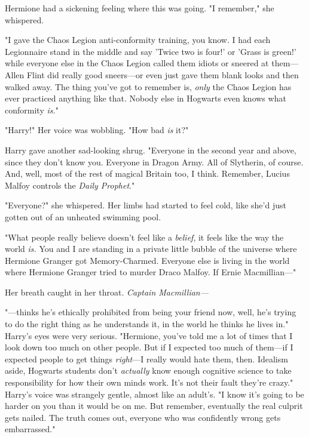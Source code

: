 Hermione had a sickening feeling where this was going. "I remember," she 
whispered.

"I gave the Chaos Legion anti-conformity training, you know. I had each 
Legionnaire stand in the middle and say 'Twice two is four!' or 'Grass is 
green!' while everyone else in the Chaos Legion called them idiots or sneered 
at them---Allen Flint did really good sneers---or even just gave them blank 
looks and then walked away. The thing you've got to remember is, \emph{only} 
the Chaos Legion has ever practiced anything like that. Nobody else in Hogwarts 
even knows what conformity \emph{is.}"

"Harry!" Her voice was wobbling. "How bad \emph{is} it?"

Harry gave another sad-looking shrug. "Everyone in the second year and above, 
since they don't know you. Everyone in Dragon Army. All of Slytherin, of 
course. And, well, most of the rest of magical Britain too, I think. Remember, 
Lucius Malfoy controls the \emph{Daily Prophet}."

"Everyone?" she whispered. Her limbs had started to feel cold, like she'd just 
gotten out of an unheated swimming pool.

"What people really believe doesn't feel like a \emph{belief}, it feels like 
the way the world \emph{is.} You and I are standing in a private little bubble 
of the universe where Hermione Granger got Memory-Charmed. Everyone else is 
living in the world where Hermione Granger tried to murder Draco Malfoy. If 
Ernie Macmillian---"

Her breath caught in her throat. \emph{Captain Macmillian---}

"---thinks he's ethically prohibited from being your friend now, well, he's 
trying to do the right thing as he understands it, in the world he thinks he 
lives in." Harry's eyes were very serious. "Hermione, you've told me a lot of 
times that I look down too much on other people. But if I expected too much of 
them---if I expected people to get things \emph{right}---I really would hate 
them, then. Idealism aside, Hogwarts students don't \emph{actually} know enough 
cognitive science to take responsibility for how their own minds work. It's not 
their fault they're crazy." Harry's voice was strangely gentle, almost like an 
adult's. "I know it's going to be harder on you than it would be on me. But 
remember, eventually the real culprit gets nailed. The truth comes out, 
everyone who was confidently wrong gets embarrassed."

